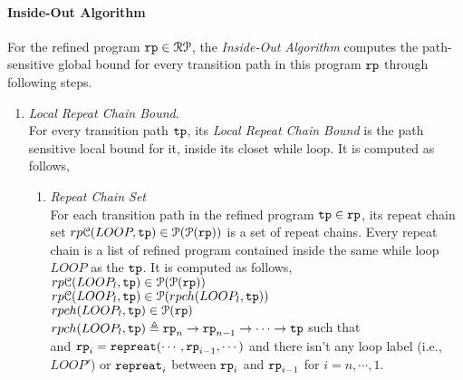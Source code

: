 \paragraph*{Inside-Out Algorithm}
For the refined program $\mathtt{rp} \in \mathcal{RP}$, the \emph{Inside-Out Algorithm}
computes the path-sensitive global bound for every transition path in this program $\mathtt{rp}$ through following steps.

\begin{enumerate}
  \item \emph{Local Repeat Chain Bound}.
  \\
  For every transition path $\mathtt{tp}$, its \emph{Local Repeat Chain Bound} is the path sensitive local bound for it, inside its closet while loop.
  It is computed as follows,
  \begin{enumerate}
\item \emph{Repeat Chain Set}
\\
For each transition path in the refined program $\mathtt{tp} \in \mathtt{rp}$, 
its repeat chain set $rp\mathcal{C}(LOOP, \mathtt{tp}) \in \mathcal{P}(\mathcal{P}(\mathtt{rp}))$
 is a set of repeat chains. 
 Every repeat chain is a list of refined program contained inside the same while loop $LOOP$ as the $\mathtt{tp}$. It is computed as follows,
\\
$rp\mathcal{C}(LOOP_l, \mathtt{tp}) \in \mathcal{P}(\mathcal{P}(\mathtt{rp}))$
\\
 $rp\mathcal{C}(LOOP_l, \mathtt{tp}) \in \mathcal{P}(rpch(LOOP_l, \mathtt{tp}))$
  \\
  $rpch(LOOP_l, \mathtt{tp}) \in \mathcal{P}(\mathtt{rp})$\\
  $rpch(LOOP_l, \mathtt{tp}) \triangleq \mathtt{rp}_n \to \mathtt{rp}_{n-1} \to \cdots \to \mathtt{tp} $
 such that \\
 and
 $\mathtt{rp}_{i}= \mathtt{repreat}(\cdots, \mathtt{rp}_{i - 1}, \cdots)$ and
 there isn't any loop label (i.e., $LOOP'$) or $\mathtt{repreat}_i$ between $\mathtt{rp}_{i}$ and $\mathtt{rp}_{i - 1}$ for $i = n, \cdots, 1$.

\end{enumerate}
\end{enumerate}
